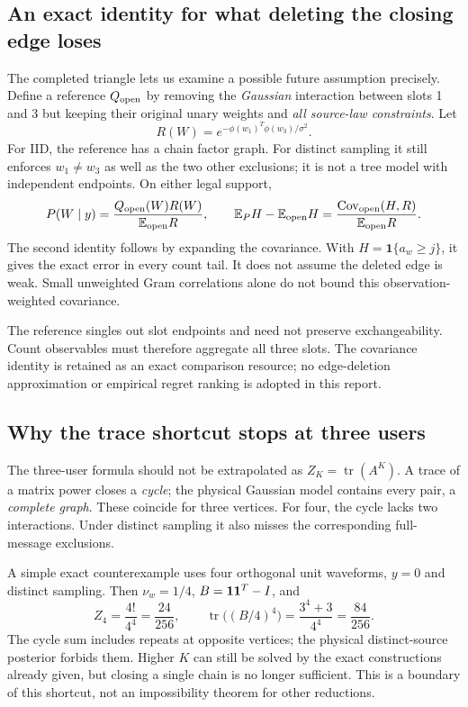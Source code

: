 \documentclass[10pt,a4paper]{article}
\newcommand{\E}{\mathbb E}
\newcommand{\ind}{\mathbf 1}
\newcommand{\tr}{\operatorname{tr}}
\begin{document}
\subsection{An exact identity for what deleting the closing edge loses}
The completed triangle lets us examine a possible future assumption precisely. Define a reference
$Q_{\rm open}$ by removing the \emph{Gaussian} interaction between slots 1 and 3 but keeping their original
unary weights and \emph{all source-law constraints}. Let
\[
 R(W)=e^{-\phi(w_1)^T\phi(w_3)/\sigma^2}.
\]
For IID, the reference has a chain factor graph. For distinct sampling it still enforces $w_1\ne w_3$ as
well as the two other exclusions; it is not a tree model with independent endpoints. On either legal support,
\begin{equation}
 P(W\mid y)=\frac{Q_{\rm open}(W)R(W)}{\E_{\rm open}R},\qquad
 \E_P H-\E_{\rm open}H
 =\frac{\operatorname{Cov}_{\rm open}(H,R)}{\E_{\rm open}R}.
 \label{eq:triangle-closure-covariance}
\end{equation}
The second identity follows by expanding the covariance. With
$H=\ind\{a_w\geq j\}$, it gives the exact error in every count tail. It does not assume the deleted edge is
weak. Small unweighted Gram correlations alone do not bound this observation-weighted covariance.

The reference singles out slot endpoints and need not preserve exchangeability. Count observables must
therefore aggregate all three slots. The covariance identity is retained as an exact comparison resource;
no edge-deletion approximation or empirical regret ranking is adopted in this report.

\subsection{Why the trace shortcut stops at three users}
The three-user formula should not be extrapolated as $Z_K=\tr(A^K)$. A trace of a matrix power closes a
\emph{cycle}; the physical Gaussian model contains every pair, a \emph{complete graph}. These coincide for
three vertices. For four, the cycle lacks two interactions. Under distinct sampling it also misses the
corresponding full-message exclusions.

A simple exact counterexample uses four orthogonal unit waveforms, $y=0$ and distinct sampling. Then
$\nu_w=1/4$, $B=\mathbf{1}\mathbf{1}^T-I$, and
\[
 Z_4=\frac{4!}{4^4}=\frac{24}{256},\qquad
 \tr\big((B/4)^4\big)=\frac{3^4+3}{4^4}=\frac{84}{256}.
\]
The cycle sum includes repeats at opposite vertices; the physical distinct-source posterior forbids them.
Higher $K$ can still be solved by the exact constructions already given, but closing a single chain is no
longer sufficient. This is a boundary of this shortcut, not an impossibility theorem for other reductions.
\end{document}
